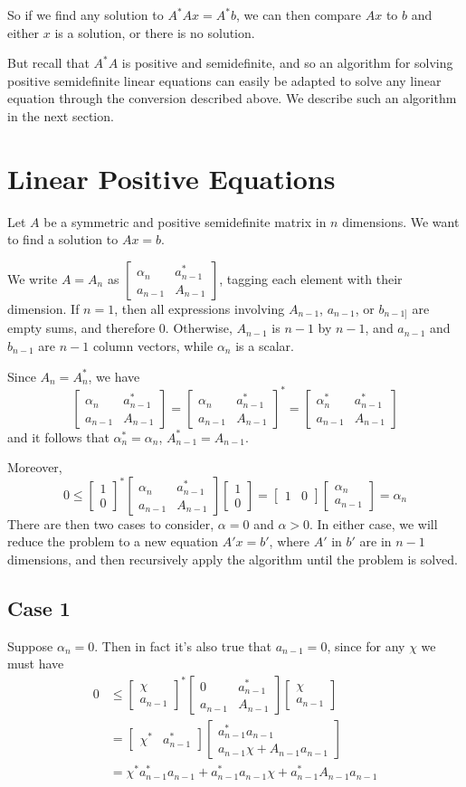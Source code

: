 \documentclass{article}
\newcommand{\bmat}[1]{\begin{bmatrix}#1\end{bmatrix}}
\begin{document}
So if we find any solution to $A^*Ax = A^*b$, we can then compare $Ax$ to $b$
and either $x$ is a solution, or there is no solution.

But recall that $A^*A$ is positive and semidefinite, and so an algorithm for
solving positive semidefinite linear equations can easily be adapted to solve
any linear equation through the conversion described above. We describe such an
algorithm in the next section.

\section{Linear Positive Equations}

Let $A$ be a symmetric and positive semidefinite matrix in $n$ dimensions. We want to find a solution to
$Ax = b$.

We write $A = A_n$ as $\bmat{\alpha_n & a^*_{n - 1} \\ a_{n - 1} & A_{n
    - 1}}$, tagging each element with their dimension.
If $n = 1$, then all expressions involving $A_{n-1}$, $a_{n - 1}$, or $b_{n - 1]}$ are
empty sums, and therefore 0. Otherwise, $A_{n - 1}$ is $n-1$ by $n-1$, and $a_{n
- 1}$ and $b_{n - 1}$ are $n-1$ column vectors, while $\alpha_n$ is a scalar.

Since $A_n=A^*_n$, we have
$$ \bmat{\alpha_n & a^*_{n-1} \\ a_{n - 1} & A_{n - 1}} = 
   \bmat{\alpha_n & a_{n-1}^* \\ a_{n-1} & A_{n-1}}^* = 
   \bmat{\alpha_n^* & a_{n-1}^* \\ a_{n-1} & A_{n-1}} $$
and it follows that $\alpha_n^*=\alpha_n$, $A_{n-1}^{*} = A_{n-1}$.

Moreover, 
$$
0 \leq \bmat{1\\0}^*\bmat{\alpha_n & a_{n-1}^* \\ a_{n-1} & A_{n-1}}\bmat{1\\0}
= \bmat{1&0}\bmat{\alpha_n \\ a_{n-1}}
= \alpha_n
$$
There are then two cases to consider, $\alpha = 0$ and $\alpha > 0$. In either
case, we will reduce the problem to a new equation $A'x = b'$, where $A'$ in
$b'$ are in $n - 1$ dimensions, and then recursively apply the algorithm until
the problem is solved.

\subsection{Case 1}
Suppose $\alpha_n=0$. Then in fact it's also true that $a_{n-1}=0$, since for
any $\chi$ we must have
\begin{align*}
  0 &\leq \bmat{\chi\\a_{n-1}}^*\bmat{0 & a_{n-1}^*
  \\ a_{n-1} & A_{n-1}}\bmat{\chi\\a_{n - 1}} \\&= \bmat{\chi^* & a_{n-1}^*} \bmat{a_{n-1}^*a_{n-1}\\a_{n-1}\chi+A_{n-1}a_{n-1}}
\\&= \chi^*a_{n-1}^*a_{n-1} + a_{n-1}^*a_{n-1}\chi + a_{n-1}^*A_{n-1}a_{n-1}
\end{align*}
\end{document}
